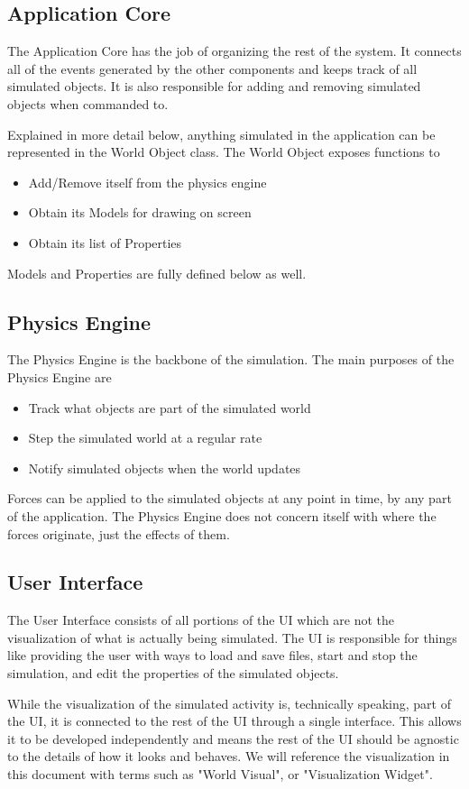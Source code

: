 \subsection{Application Core}
The Application Core has the job of organizing the rest of the system. It connects all of the events generated by the other components and keeps track of all simulated objects. It is also responsible for adding and removing simulated objects when commanded to.

Explained in more detail below, anything simulated in the application can be represented in the World Object class. The World Object exposes functions to
\begin{itemize}
	\item Add/Remove itself from the physics engine
	\item Obtain its Models for drawing on screen
	\item Obtain its list of Properties
\end{itemize}

Models and Properties are fully defined below as well.

\subsection{Physics Engine}
The Physics Engine is the backbone of the simulation. The main purposes of the Physics Engine are
	\begin{itemize}
		\item Track what objects are part of the simulated world
		\item Step the simulated world at a regular rate
		\item Notify simulated objects when the world updates
	\end{itemize}
Forces can be applied to the simulated objects at any point in time, by any part of the application. The Physics Engine does not concern itself with where the forces originate, just the effects of them.
 
\subsection{User Interface}
The User Interface consists of all portions of the UI which are not the visualization of what is actually being simulated. The UI is responsible for things like providing the user with ways to load and save files, start and stop the simulation, and edit the properties of the simulated objects.

While the visualization of the simulated activity is, technically speaking, part of the UI, it is connected to the rest of the UI through a single interface. This allows it to be developed independently and means the rest of the UI should be agnostic to the details of how it looks and behaves. We will reference the visualization in this document with terms such as "World Visual", or "Visualization Widget".

